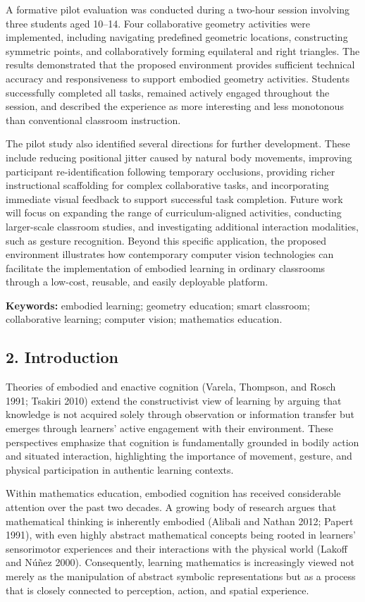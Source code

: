 A formative pilot evaluation was conducted during a two-hour session
involving three students aged 10--14. Four collaborative geometry
activities were implemented, including navigating predefined geometric
locations, constructing symmetric points, and collaboratively forming
equilateral and right triangles. The results demonstrated that the
proposed environment provides sufficient technical accuracy and
responsiveness to support embodied geometry activities. Students
successfully completed all tasks, remained actively engaged throughout
the session, and described the experience as more interesting and less
monotonous than conventional classroom instruction.

The pilot study also identified several directions for further
development. These include reducing positional jitter caused by natural
body movements, improving participant re-identification following
temporary occlusions, providing richer instructional scaffolding for
complex collaborative tasks, and incorporating immediate visual feedback
to support successful task completion. Future work will focus on
expanding the range of curriculum-aligned activities, conducting
larger-scale classroom studies, and investigating additional interaction
modalities, such as gesture recognition. Beyond this specific
application, the proposed environment illustrates how contemporary
computer vision technologies can facilitate the implementation of
embodied learning in ordinary classrooms through a low-cost, reusable,
and easily deployable platform.

\textbf{Keywords:} embodied learning; geometry education; smart
classroom; collaborative learning; computer vision; mathematics
education.

\subsection{2. Introduction}\label{introduction}

Theories of embodied and enactive cognition (Varela, Thompson, and Rosch
1991; Tsakiri 2010) extend the constructivist view of learning by
arguing that knowledge is not acquired solely through observation or
information transfer but emerges through learners' active engagement
with their environment. These perspectives emphasize that cognition is
fundamentally grounded in bodily action and situated interaction,
highlighting the importance of movement, gesture, and physical
participation in authentic learning contexts.

Within mathematics education, embodied cognition has received
considerable attention over the past two decades. A growing body of
research argues that mathematical thinking is inherently embodied
(Alibali and Nathan 2012; Papert 1991), with even highly abstract
mathematical concepts being rooted in learners' sensorimotor experiences
and their interactions with the physical world (Lakoff and Núñez 2000).
Consequently, learning mathematics is increasingly viewed not merely as
the manipulation of abstract symbolic representations but as a process
that is closely connected to perception, action, and spatial experience.

